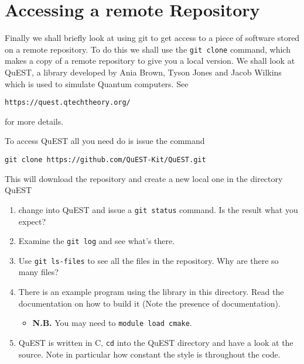 \documentclass[a4paper, 12pt]{article}
\def \cc   {\tt }               %
\begin{document}
\section{Accessing a remote Repository}
\label{Remote}

Finally we shall briefly look at using git to get access to a piece of software stored on a remote repository. To do this we shall use the {\cc git clone} command, which makes a copy of a remote repository to give you a local version. We shall look at QuEST, a library developed by Ania Brown, Tyson Jones and Jacob Wilkins which is used to simulate Quantum computers. See

{\cc https://quest.qtechtheory.org/}

for more details.

To access QuEST all you need do is issue the command

{\cc git clone https://github.com/QuEST-Kit/QuEST.git}

This will download the repository and create a new local one in the directory QuEST

\begin{enumerate}

  \item change into QuEST and issue a {\cc git status} command. Is the result what you expect?

  \item Examine the {\cc git log} and see what's there.

  \item Use {\cc git ls-files} to see all the files in the repository. Why are there so many files?

  \item There is an example program using the library in this directory. Read the documentation on how to build it (Note the presence of documentation).
  \begin{itemize}
      \item \textbf{N.B.} You may need to {\cc module load cmake}.
  \end{itemize}

  \item QuEST is written in C, {\cc cd} into the QuEST directory and have a look at the source. Note in particular how constant the style is throughout the code.

\end{enumerate}

\end{document}
